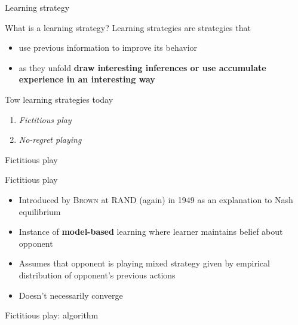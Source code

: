 \begin{frame}{Learning strategy}
    \begin{exampleblock}{What is a learning strategy?}
        Learning strategies are strategies that
        \begin{itemize}
            \item use previous information to improve its behavior
            \item as they unfold \textbf{draw interesting inferences or use accumulate experience
            in an interesting way}
        \end{itemize}
    \end{exampleblock}

    \vspace{0.5cm}
    \begin{block}{Tow learning strategies today}
        \begin{enumerate}
            \item \textit{Fictitious play}
            \item \textit{No-regret playing}
        \end{enumerate}
    \end{block}
\end{frame}

\begin{frame}{Fictitious play}
    \begin{block}{Fictitious play}
        \begin{itemize}
            \item Introduced by \textsc{Brown} at RAND (again) in 1949 as an explanation to Nash
            equilibrium
            \item Instance of \textbf{model-based} learning where learner maintains belief about opponent
            \item Assumes that opponent is playing mixed strategy given by empirical distribution of
            opponent’s previous actions
            \item Doesn't necessarily converge
        \end{itemize}
    \end{block}
\end{frame}

\begin{frame}{Fictitious play: algorithm}
    \begin{algorithm}[H]
    \caption{Fictitious play algorithm}
    \end{algorithm}
\end{frame}

